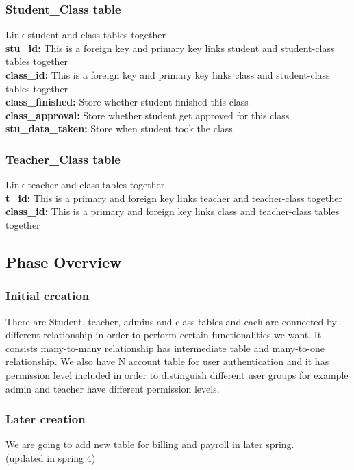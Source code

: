 \subsubsection{Student\_Class table}
Link student and class tables together\\
\textbf{stu\_id:} This is a foreign key and primary key links student and student-class tables together\\
\textbf{class\_id:} This is a foreign key and primary key links class and student-class tables together\\
\textbf{class\_finished:} Store whether student finished this class\\
\textbf{class\_approval:} Store whether student get approved for this class\\
\textbf{stu\_data\_taken:} Store when student took the class
\subsubsection{Teacher\_Class table}
Link teacher and class tables together\\
\textbf{t\_id:} This is a primary and foreign key links teacher and teacher-class together\\
\textbf{class\_id:} This is a primary and foreign key links class and teacher-class tables together


\subsection{Phase Overview}

\subsubsection{Initial creation}
There are Student, teacher, admins and class tables and each are connected by different relationship in order to perform certain functionalities we want. It consists many-to-many relationship has intermediate table and many-to-one relationship. We also have N account table for user authentication and it has permission level included in order to distinguish different user groups for example admin and teacher have different permission levels.\\

\subsubsection{Later creation}
We are going to add new table for billing and payroll in later spring.\\
(updated in spring 4)\\

